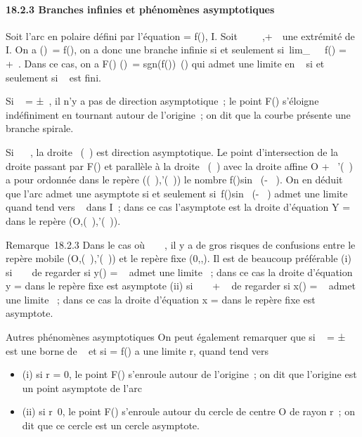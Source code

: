 \documentclass[]{article}
\begin{document}
\paragraph{18.2.3 Branches infinies et phénomènes asymptotiques}

Soit \Gamma l'arc en polaire défini par l'équation \rho = f(\theta), \theta \in I. Soit \alpha~ \in
{}~ \cup\-\infty~,+\infty~\ une extrémité de I. On a
\F(\theta)\ =
f(\theta), on a donc une branche infinie si et seulement
si~lim_\theta\rightarrow~\alpha~~f(\theta) =
+\infty~. Dans ce cas, on a  F(\theta) \over
\F(\theta)\
= sgn(f(\theta))\vecu~(\theta) qui
admet une limite en \alpha~ si et seulement si \alpha~ est fini.

Si \alpha~ = ±\infty~, il n'y a pas de direction asymptotique~; le point F(\theta)
s'éloigne indéfiniment en tournant autour de l'origine~; on dit que la
courbe présente une branche spirale.

Si \alpha~ \in {}~, la droite ~\vecu(\alpha~) est direction
asymptotique. Le point d'intersection de la droite passant par F(\theta) et
parallèle à la droite ~\vecu(\alpha~) avec la droite affine
O + \mathbb{R}~\vecu'(\alpha~) a pour ordonnée dans le repère
(\vecu(\alpha~),\vecu'(\alpha~)) le nombre
f(\theta)sin~ (\theta - \alpha~). On en déduit que l'arc admet
une asymptote si et seulement si~f(\theta)sin~ (\theta -
\alpha~) admet une limite \ell quand \theta tend vers \alpha~ dans I~; dans ce cas
l'asymptote est la droite d'équation Y = \ell dans le repère
(O,\vecu(\alpha~),\vecu'(\alpha~)).

Remarque~18.2.3 Dans le cas où \alpha~ \in \pi~  , il y
a de gros risques de confusions entre le repère mobile
(O,\vecu(\alpha~),\vecu'(\alpha~)) et le
repère fixe (0,\vec\imath,). Il
est de beaucoup préférable (i) si \alpha~ \in \pi~ de regarder si y(\theta) =
\rhosin~ \theta admet une limite \ell~; dans ce cas la
droite d'équation y = \ell dans le repère fixe est asymptote (ii) si \alpha~ \in
\pi~ \over 2 + \pi~\mathbb{Z} de regarder si x(\theta) =
\rhocos~ \theta admet une limite \ell~; dans ce cas la
droite d'équation x = \ell dans le repère fixe est asymptote.

Autres phénomènes asymptotiques On peut également remarquer que si \alpha~ =
±\infty~ est une borne de \alpha~ et si \rho = f(\theta) a une limite r, quand \theta tend vers \alpha~

\begin{itemize}
\itemsep1pt\parskip0pt
\item
  (i) si r = 0, le point F(\theta) s'enroule autour de l'origine~; on dit que
  l'origine est un point asymptote de l'arc
\item
  (ii) si r\neq~0, le point F(\theta) s'enroule autour
  du cercle de centre O de rayon r~; on dit que ce
  cercle est un cercle asymptote.
\end{itemize}
\end{document}
